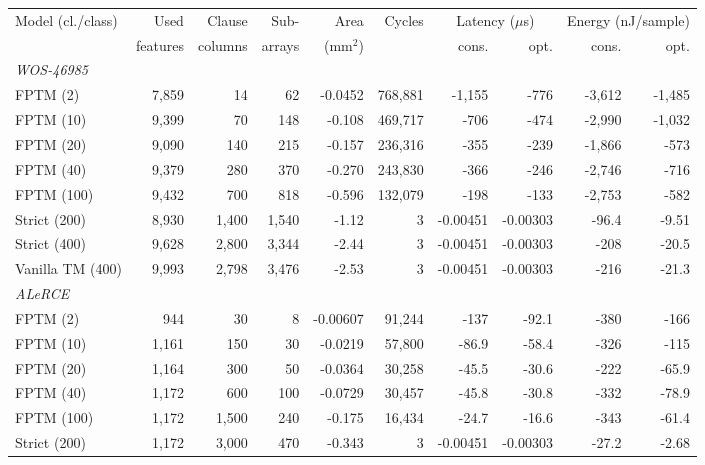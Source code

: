 \begin{tabular}{lrrrrrrrrr}
\toprule
\multirow{2}{*}{Model (cl./class)} & Used & Clause & Sub- & Area & Cycles & \multicolumn{2}{c}{Latency ($\mu$s)} & \multicolumn{2}{c}{Energy (nJ/sample)} \\
 & features & columns & arrays & (mm$^2$) & & cons. & opt. & cons. & opt. \\
\midrule
\multicolumn{10}{l}{\textit{WOS-46985}} \\
FPTM (2) & 7,859 & 14 & 62 & \hyp{0.0452} & 768,881 & \hyp{1,155} & \hyp{776} & \hyp{3,612} & \hyp{1,485} \\
FPTM (10) & 9,399 & 70 & 148 & \hyp{0.108} & 469,717 & \hyp{706} & \hyp{474} & \hyp{2,990} & \hyp{1,032} \\
FPTM (20) & 9,090 & 140 & 215 & \hyp{0.157} & 236,316 & \hyp{355} & \hyp{239} & \hyp{1,866} & \hyp{573} \\
FPTM (40) & 9,379 & 280 & 370 & \hyp{0.270} & 243,830 & \hyp{366} & \hyp{246} & \hyp{2,746} & \hyp{716} \\
FPTM (100) & 9,432 & 700 & 818 & \hyp{0.596} & 132,079 & \hyp{198} & \hyp{133} & \hyp{2,753} & \hyp{582} \\
Strict (200) & 8,930 & 1,400 & 1,540 & \hyp{1.12} & 3 & \hyp{0.00451} & \hyp{0.00303} & \hyp{96.4} & \hyp{9.51} \\
Strict (400) & 9,628 & 2,800 & 3,344 & \hyp{2.44} & 3 & \hyp{0.00451} & \hyp{0.00303} & \hyp{208} & \hyp{20.5} \\
Vanilla TM (400) & 9,993 & 2,798 & 3,476 & \hyp{2.53} & 3 & \hyp{0.00451} & \hyp{0.00303} & \hyp{216} & \hyp{21.3} \\
\midrule
\multicolumn{10}{l}{\textit{ALeRCE}} \\
FPTM (2) & 944 & 30 & 8 & \hyp{0.00607} & 91,244 & \hyp{137} & \hyp{92.1} & \hyp{380} & \hyp{166} \\
FPTM (10) & 1,161 & 150 & 30 & \hyp{0.0219} & 57,800 & \hyp{86.9} & \hyp{58.4} & \hyp{326} & \hyp{115} \\
FPTM (20) & 1,164 & 300 & 50 & \hyp{0.0364} & 30,258 & \hyp{45.5} & \hyp{30.6} & \hyp{222} & \hyp{65.9} \\
FPTM (40) & 1,172 & 600 & 100 & \hyp{0.0729} & 30,457 & \hyp{45.8} & \hyp{30.8} & \hyp{332} & \hyp{78.9} \\
FPTM (100) & 1,172 & 1,500 & 240 & \hyp{0.175} & 16,434 & \hyp{24.7} & \hyp{16.6} & \hyp{343} & \hyp{61.4} \\
Strict (200) & 1,172 & 3,000 & 470 & \hyp{0.343} & 3 & \hyp{0.00451} & \hyp{0.00303} & \hyp{27.2} & \hyp{2.68} \\

\end{tabular}
